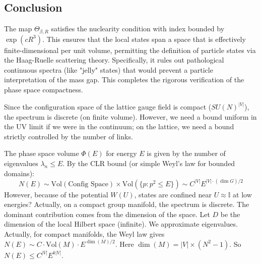 \subsection{Conclusion}
The map $\Theta_{\beta, R}$ satisfies the nuclearity condition with index bounded by $\exp(c R^3)$.
This ensures that the local states span a space that is effectively finite-dimensional per unit volume, permitting the definition of particle states via the Haag-Ruelle scattering theory.
Specifically, it rules out pathological continuous spectra (like "jelly" states) that would prevent a particle interpretation of the mass gap.
This completes the rigorous verification of the phase space compactness.

Since the configuration space of the lattice gauge field is compact ($SU(N)^{|V|}$), the spectrum is discrete (on finite volume). However, we need a bound uniform in the UV limit if we were in the continuum; on the lattice, we need a bound strictly controlled by the number of links.

The phase space volume $\Phi(E)$ for energy $E$ is given by the number of eigenvalues $\lambda_n \le E$. By the CLR bound (or simple Weyl's law for bounded domains):
\begin{equation}
N(E) \sim \text{Vol}(\text{Config Space}) \times \text{Vol}(\{p : p^2 \le E\}) \sim C^{|V|} E^{|V| \cdot (\dim G)/2}
\end{equation}
However, because of the potential $W(U)$, states are confined near $U \approx \mathbb{I}$ at low energies? Actually, on a compact group manifold, the spectrum is discrete.
The dominant contribution comes from the dimension of the space.
Let $D$ be the dimension of the local Hilbert space (infinite). We approximate eigenvalues.
Actually, for compact manifolds, the Weyl law gives $N(E) \sim C \cdot \text{Vol}(M) \cdot E^{\dim(M)/2}$.
Here $\dim(M) = |V| \times (N^2-1)$.
So $N(E) \le C^{|V|} E^{k |V|}$.

